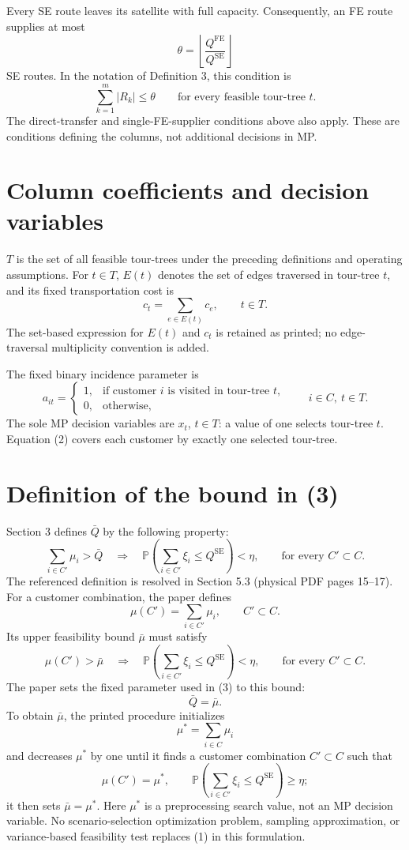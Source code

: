 \documentclass{article}
\begin{document}
Every SE route leaves its satellite with full capacity. Consequently, an FE route supplies at most
\[
\theta=\left\lfloor\frac{Q^{\mathrm{FE}}}{Q^{\mathrm{SE}}}\right\rfloor
\]
SE routes. In the notation of Definition 3, this condition is
\[
\sum_{k=1}^{m}|R_k|\leq\theta
\qquad\text{for every feasible tour-tree }t.
\]
The direct-transfer and single-FE-supplier conditions above also apply. These are conditions defining the columns, not additional decisions in MP.

\section*{Column coefficients and decision variables}
$T$ is the set of all feasible tour-trees under the preceding definitions and operating assumptions. For $t\in T$, $E(t)$ denotes the set of edges traversed in tour-tree $t$, and its fixed transportation cost is
\[
c_t=\sum_{e\in E(t)}c_e,\qquad t\in T.
\]
The set-based expression for $E(t)$ and $c_t$ is retained as printed; no edge-traversal multiplicity convention is added.

The fixed binary incidence parameter is
\[
a_{it}=\begin{cases}
1,&\text{if customer }i\text{ is visited in tour-tree }t,\\
0,&\text{otherwise},
\end{cases}
\qquad i\in C,\ t\in T.
\]
The sole MP decision variables are $x_t$, $t\in T$: a value of one selects tour-tree $t$. Equation (2) covers each customer by exactly one selected tour-tree.

\section*{Definition of the bound in (3)}
Section 3 defines $\bar Q$ by the following property:
\[
\sum_{i\in C'}\mu_i>\bar Q
\quad\Longrightarrow\quad
\mathbb P\left(\sum_{i\in C'}\xi_i\leq Q^{\mathrm{SE}}\right)<\eta,
\qquad\text{for every }C'\subset C.
\]
The referenced definition is resolved in Section 5.3 (physical PDF pages 15--17). For a customer combination, the paper defines
\[
\mu(C')=\sum_{i\in C'}\mu_i,\qquad C'\subset C.
\]
Its upper feasibility bound $\bar\mu$ must satisfy
\[
\mu(C')>\bar\mu
\quad\Longrightarrow\quad
\mathbb P\left(\sum_{i\in C'}\xi_i\leq Q^{\mathrm{SE}}\right)<\eta,
\qquad\text{for every }C'\subset C.
\]
The paper sets the fixed parameter used in (3) to this bound:
\[
\boxed{\bar Q=\bar\mu.}
\]
To obtain $\bar\mu$, the printed procedure initializes
\[
\mu^*=\sum_{i\in C}\mu_i
\]
and decreases $\mu^*$ by one until it finds a customer combination $C'\subset C$ such that
\[
\mu(C')=\mu^*,\qquad
\mathbb P\left(\sum_{i\in C'}\xi_i\leq Q^{\mathrm{SE}}\right)\geq\eta;
\]
it then sets $\bar\mu=\mu^*$. Here $\mu^*$ is a preprocessing search value, not an MP decision variable. No scenario-selection optimization problem, sampling approximation, or variance-based feasibility test replaces (1) in this formulation.
\end{document}
